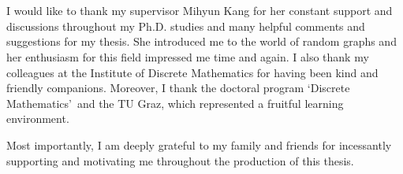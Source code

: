 \documentclass[twoside,openright,bibliography=totoc]{scrreprt}
\theoremstyle{remark}
\theoremstyle{definition}
\theoremstyle{claim}
\begin{document}

\cleardoublepage

\chapter*{}

I would like to thank my supervisor Mihyun Kang for her constant support and discussions
throughout my Ph.D. studies and many helpful comments and suggestions for my thesis. She introduced me to the world of random graphs and her enthusiasm for this field impressed me time and again. I also thank my colleagues at the Institute of Discrete Mathematics for having been kind and friendly companions. Moreover, I thank the doctoral program \lq Discrete Mathematics\rq\ and the TU Graz, which represented a fruitful learning environment.

Most importantly, I am deeply grateful to my family and friends for incessantly supporting and motivating me throughout the production of this thesis.

\cleardoublepage

\setcounter{tocdepth}{1}
\tableofcontents





















\end{document}
